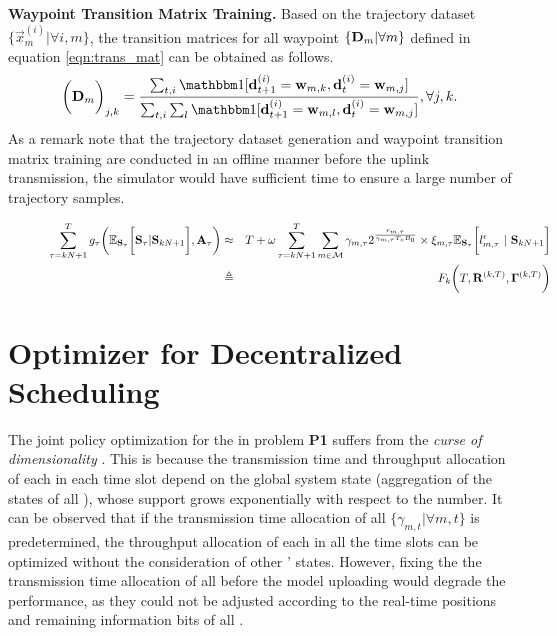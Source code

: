 \textbf{Waypoint Transition Matrix Training.} Based on the trajectory dataset $ \{\vec{x}^{(i)}_{m} | \forall i,m\} $, the transition matrices for all {\IAVs} waypoint $\{\mathbf{D}_{m}| \forall m\}$ defined in equation \eqref{eqn:trans_mat} can be obtained as follows. 
\begin{align*}
    \Paren{\TransD_{m}}_{j,k} = 
        \frac{
            \sum_{t,i} \indicator\bracket{ \vec{d}^{(i)}_{t+1}=\vec{w}_{m,k}, \vec{d}^{(i)}_{t}=\vec{w}_{m,j} }
        }{
            \sum_{t,i}\sum_{l} \indicator \bracket{ \vec{d}^{(i)}_{t+1}=\vec{w}_{m,l}, \vec{d}^{(i)}_{t}=\vec{w}_{m,j} }
        }, \forall j,k.
\end{align*}
As a remark note that the trajectory dataset generation and waypoint transition matrix training are conducted in an offline manner before the uplink transmission, the {\fwName} simulator would have sufficient time to ensure a large number of trajectory samples. 

\begin{figure*}[t]
    \begin{eqnarray}
            \sum_{\tau=kN+1}^{T} g_{\tau}\bigg(
                \mathbb{E}_{\mathbf{S}_{\tau}} \bigg[ \mathbf{S}_{\tau} | \mathbf{S}_{kN+1} \bigg], \mathbf{A}_{\tau}
            \bigg) 
            &\approx&
            T + \omega \sum_{\tau=kN+1}^{T} \sum_{m\in\mathcal{M}} \gamma_{m,\tau}
            2^\frac{r_{m,\tau}}{\gamma_{m,\tau}T_s B_0} 
            \times \xi_{m,\tau} \mathbb{E}_{\mathbf{S}_{\tau}} \bigg[ l_{m,\tau}^{\epsilon}~|~\mathbf{S}_{kN+1} \bigg] \nonumber\\
            &\triangleq&    F_k\bigg( T, \mathbf{R}^{(k,T)}, \mathbf{\Gamma}^{(k,T)} \bigg)
            \label{eqn:fk}
    \end{eqnarray}
    \hrulefill
\end{figure*}

\section{{\fwName} Optimizer for Decentralized Scheduling}
\label{sec:new_framework}

The joint policy optimization for the {\IAVs} in problem {\bf P1} suffers from the {\it curse of dimensionality} \cite{mdp-huang,mdp-lv}.
This is because the transmission time and throughput allocation of each {\IAV} in each time slot depend on the global system state (aggregation of the states of all {\IAVs}), whose support grows exponentially with respect to the {\IAV} number. It can be observed that if the transmission time allocation of all {\IAVs} $\{\gamma_{m,t}|\forall m,t\}$ is predetermined, the throughput allocation of each {\IAV} in all the time slots can be optimized without the consideration of other {\IAVs}' states. However, fixing the the transmission time allocation of all {\IAVs} before the model uploading would degrade the performance, as they could not be adjusted according to the real-time positions and remaining information bits of all {\IAVs}.

